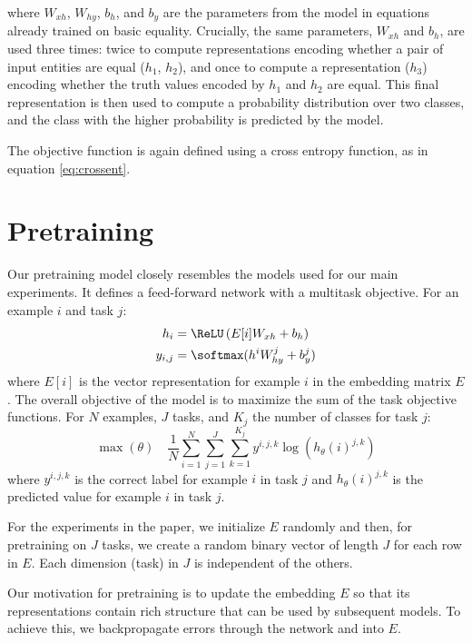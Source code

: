 where $W_{xh}$, $W_{hy}$, $b_h$, and $b_y$ are the parameters from the model in equations  already trained on basic equality. Crucially, the same parameters, $W_{xh}$ and $b_h$, are used three times: twice to compute representations encoding whether a pair of input entities are equal ($h_1$, $h_2$), and once to compute a representation ($h_{3}$) encoding whether the truth values encoded by $h_1$ and $h_2$ are equal. This final representation is then used to compute a probability distribution over two classes, and the class with the higher probability is predicted by the model.

The objective function is again defined using a cross entropy function, as in equation \ref{eq:crossent}.




\section{Pretraining}\label{app:pretraining}

Our pretraining model closely resembles the models used for our main experiments. It defines a feed-forward network with a multitask objective. For an example $i$ and task $j$:
%
\begin{align}
  h_{i} &= \ReLU\left( E[i]W_{xh} + b_{h} \right) \\
  y_{i,j} &= \softmax(h^{i}W_{hy}^{j} + b_{y}^{j})
\end{align}
%
where $E[i]$ is the vector representation for example $i$ in the embedding matrix $E$. The overall objective of the model is to maximize the sum of the task objective functions. For $N$ examples, $J$ tasks, and $K_{j}$ the number of classes for task $j$:
%
\begin{equation}
  \max(\theta)
  \quad
  \frac{1}{N}
  \sum_{i=1}^{N}
  \sum_{j=1}^{J}
  \sum_{k=1}^{K_{j}}
  y^{i,j,k} \log \left( h_{\theta}(i)^{j,k} \right)
\end{equation}
%
where $y^{i,j,k}$ is the correct label for example $i$ in task $j$ and $h_{\theta}(i)^{j,k}$ is the predicted value for example $i$ in task $j$.

For the experiments in the paper, we initialize $E$ randomly and then, for pretraining on $J$ tasks, we create a random binary vector of length $J$ for each row in $E$. Each dimension (task) in $J$ is independent of the others.

Our motivation for pretraining is to update the embedding $E$ so that its representations contain rich structure that can be used by subsequent models. To achieve this, we backpropagate errors through the network and into $E$.

